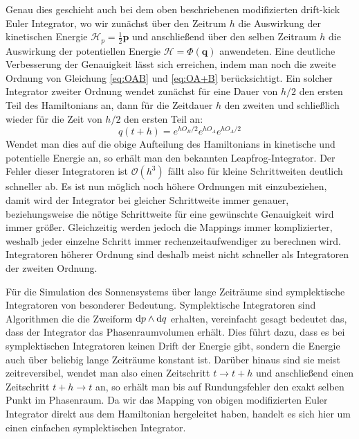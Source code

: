 \documentclass[12pt,a4paper,twoside]{article}
\renewcommand{\vec}{\mathbf}
\renewcommand{\H}{\mathcal H}
\begin{document}
Genau dies geschieht auch bei dem oben beschriebenen modifizierten drift-kick Euler Integrator,
wo wir zunächst über den Zeitrum $h$ die Auswirkung der kinetischen Energie $\H_p=\frac{1}{2}\vec{p}$ und anschließend über den selben Zeitraum $h$ die Auswirkung der potentiellen Energie $\H=\Phi(\vec{q})$ anwendeten.
Eine deutliche Verbesserung der Genauigkeit lässt sich erreichen, indem man noch die zweite Ordnung von Gleichung \ref{eq:OAB} und \ref{eq:OA+B} berücksichtigt. Ein solcher Integrator zweiter Ordnung wendet zunächst für eine Dauer von $h/2$ den ersten Teil des Hamiltonians an, dann für die Zeitdauer $h$ den zweiten und schließlich wieder für die Zeit von $h/2$ den ersten Teil an:
\begin{equation}
q(t+h)=e^{hO_B/2}e^{hO_A}e^{hO_A/2} \label{eq:secondorder}
\end{equation}
Wendet man dies auf die obige Aufteilung des Hamiltonians in kinetische und potentielle Energie an, so erhält man den bekannten Leapfrog-Integrator\cite{Duncan1998}. Der Fehler dieser Integratoren ist $\mathcal{O}(h^3)$ fällt also für kleine Schrittweiten deutlich schneller ab\cite{Chambers1999}.
Es ist nun möglich noch höhere Ordnungen mit einzubeziehen, damit wird der Integrator bei gleicher Schrittweite immer genauer, beziehungsweise die nötige Schrittweite für eine gewünschte Genauigkeit wird immer größer. Gleichzeitig werden jedoch die Mappings immer komplizierter, weshalb jeder einzelne Schritt immer rechenzeitaufwendiger zu berechnen wird. Integratoren höherer Ordnung sind deshalb meist nicht schneller als Integratoren der zweiten Ordnung\cite{Chambers1999}.

Für die Simulation des Sonnensystems über lange Zeiträume sind symplektische Integratoren von besonderer Bedeutung. Symplektische Integratoren sind Algorithmen die die Zweiform $\dif p \wedge \dif q$ erhalten, vereinfacht gesagt bedeutet das, dass der Integrator das Phasenraumvolumen erhält\cite{Duncan1998}. Dies führt dazu, dass es bei symplektischen Integratoren keinen Drift der Energie gibt, sondern die Energie auch über beliebig lange Zeiträume konstant ist\cite{Binney2008}. Darüber hinaus sind sie meist zeitreversibel, wendet man also einen Zeitschritt $t\to t+h$ und anschließend einen Zeitschritt $t+h\to t$ an, so erhält man bis auf Rundungsfehler den exakt selben Punkt im Phasenraum\cite{Duncan1998}.
Da wir das Mapping von obigen modifizierten Euler Integrator direkt aus dem Hamiltonian hergeleitet haben, handelt es sich hier um einen einfachen symplektischen Integrator\cite{Binney2008}.
\end{document}
